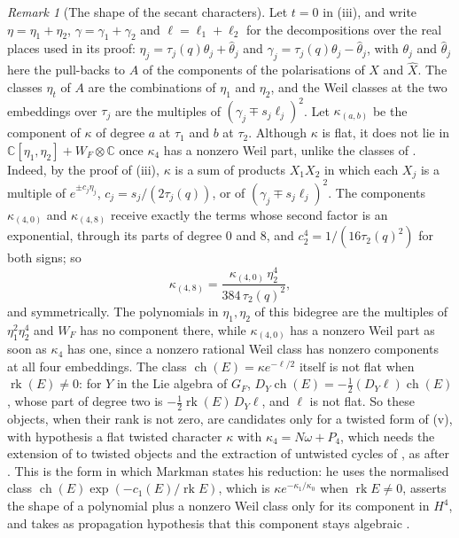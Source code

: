 \documentclass[11pt,reqno]{amsart}
\theoremstyle{plain}
\theoremstyle{definition}
\theoremstyle{remark}
\newtheorem{remark}[theorem]{Remark}
\newcommand{\CC}{\mathbb{C}}
\DeclareMathOperator{\ch}{ch}
\DeclareMathOperator{\rk}{rk}
\begin{document}
\begin{remark}[The shape of the secant characters]\label{rem:quarticsecantshape}
Let $t=0$ in (iii), and write
$\eta=\eta_{1}+\eta_{2}$, $\gamma=\gamma_{1}+\gamma_{2}$ and
$\ell=\ell_{1}+\ell_{2}$ for the decompositions over the real places used in
its proof: $\eta_{j}=\tau_{j}(q)\theta_{j}+\widehat\theta_{j}$ and
$\gamma_{j}=\tau_{j}(q)\theta_{j}-\widehat\theta_{j}$, with $\theta_{j}$ and
$\widehat\theta_{j}$ here the pull-backs to $A$ of the components of the
polarisations of $X$ and $\widehat X$. The classes $\eta_{t}$ of $A$ are the
combinations of $\eta_{1}$ and $\eta_{2}$, and the Weil classes at the two
embeddings over $\tau_{j}$ are the multiples of
$(\gamma_{j}\mp s_{j}\ell_{j})^{2}$. Let $\kappa_{(a,b)}$ be the component of
$\kappa$ of degree $a$ at $\tau_{1}$ and $b$ at $\tau_{2}$. Although $\kappa$
is flat, it does not lie in $\CC[\eta_{1},\eta_{2}]+W_{F}\otimes\CC$ once
$\kappa_{4}$ has a nonzero Weil part, unlike the classes of
. Indeed, by the proof of (iii),
$\kappa$ is a sum of products $X_{1}X_{2}$ in which each $X_{j}$ is a multiple
of $e^{\pm c_{j}\eta_{j}}$, $c_{j}=s_{j}/(2\tau_{j}(q))$, or of
$(\gamma_{j}\mp s_{j}\ell_{j})^{2}$. The components $\kappa_{(4,0)}$ and
$\kappa_{(4,8)}$ receive exactly the terms whose second factor is an
exponential, through its parts of degree $0$ and $8$, and
$c_{2}^{4}=1/(16\tau_{2}(q)^{2})$ for both signs; so
\[
  \kappa_{(4,8)}=\frac{\kappa_{(4,0)}\,\eta_{2}^{4}}{384\,\tau_{2}(q)^{2}},
\]
and symmetrically. The polynomials in $\eta_{1},\eta_{2}$ of this bidegree
are the multiples of $\eta_{1}^{2}\eta_{2}^{4}$ and $W_{F}$ has no component
there, while $\kappa_{(4,0)}$ has a nonzero Weil part as soon as $\kappa_{4}$
has one, since a nonzero rational Weil class has nonzero components at all
four embeddings. The class $\ch(E)=\kappa e^{-\ell/2}$ itself is not flat
when $\rk(E)\ne0$: for $Y$ in the Lie algebra of $G_{F}$,
$D_{Y}\ch(E)=-\tfrac12(D_{Y}\ell)\ch(E)$, whose part of degree two is
$-\tfrac12\rk(E)\,D_{Y}\ell$, and $\ell$ is not flat. So these objects, when
their rank is not zero, are candidates only for a twisted form of (v), with
hypothesis a flat twisted character $\kappa$ with $\kappa_{4}=N\omega+P_{4}$,
which needs the extension of  to twisted objects \cite{Per26}
and the extraction of untwisted cycles of \cite[Section~2]{Mar25b}, as after
. This is the form in which Markman states his
reduction: he uses the normalised class $\ch(E)\exp(-c_{1}(E)/\rk E)$, which is
$\kappa e^{-\kappa_{1}/\kappa_{0}}$ when $\rk E\ne0$, asserts the shape of a
polynomial plus a nonzero Weil class only for its component in $H^{4}$, and
takes as propagation hypothesis that this component stays algebraic
\cite[Proposition~10.2.1, Corollary~10.2.3]{Mar25c}.
\end{remark}
\end{document}
